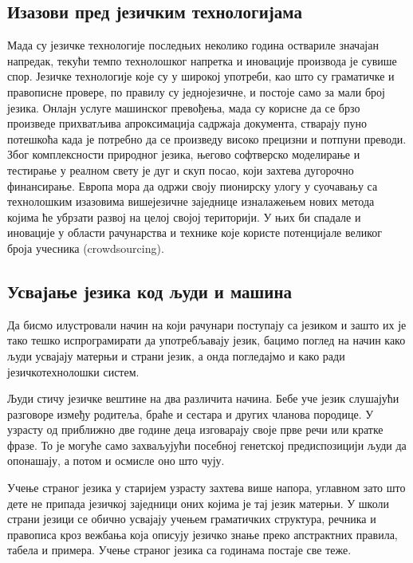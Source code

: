 \begin{multicols}{2}
\subsection{Изазови пред језичким технологијама}
  
Мада су језичке технологије последњих неколико година оствариле значајан напредак, текући темпо технолошког напретка и иновације про\-из\-во\-да је сувише спор. Језичке технологије које су у широкој употреби, као што су граматичке и правописне провере, по правилу су једнојезичне, и постоје само за мали број језика. Онлајн услуге машинског превођења, мада су корисне да се брзо произведе при\-хват\-љи\-ва апроксимација садржаја документа, стварају пуно потешкоћа када је потребно да се произведу високо прецизни и потпуни преводи. Због комплексности природног језика, његово софтверско моделирање и тестирање у реалном свету је дуг и скуп посао, који захтева дугорочно финансирање. Европа мора да одржи своју пионирску улогу у суочавању са технолошким изазовима вишејезичне заједнице изналажењем нових метода којима ће убрзати развој на целој својој територији. У њих би спадале и иновације у области рачунарства и  технике које користе потенцијале великог броја учесника (crowdsourcing). 

\subsection {Усвајање језика код људи и машина}
  
Да бисмо илустровали начин на који рачунари поступају са језиком и зашто их је тако тешко испрограмирати да употребљавају језик, бацимо поглед на начин како људи усвајају матерњи и страни језик, а онда погледајмо и како ради језичкотехнолошки систем. 

Људи стичу језичке вештине на два различита начина. Бебе уче језик слушајући  разговоре између родитеља, браће и сестара и других чланова породице. У узрасту од приближно две године деца изговарају своје прве речи или кратке фразе. То је могуће само захваљујући посебној генетској предиспозицији људи да опонашају, а потом и осмисле оно што чују. 

Учење страног језика у старијем узрасту захтева више напора, углавном зато што дете не припада језичкој заједници оних којима је тај језик матерњи. У школи страни језици се обично усвајају учењем граматичких структура, речника и правописа кроз вежбања која описују језичко знање преко апстрактних правила, табела и примера.  Учење страног језика са годинама постаје све теже. 


\end{multicols}
